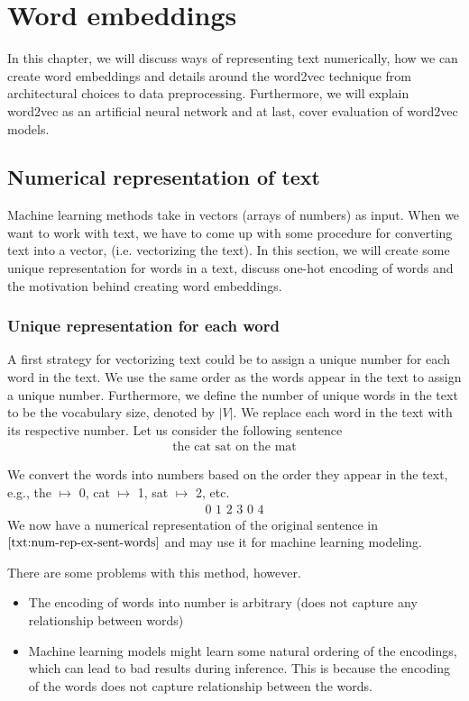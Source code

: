 \chapter{Word embeddings}
In this chapter, we will discuss ways of representing text numerically, how we can create word embeddings and details around the word2vec technique from architectural choices to data preprocessing. Furthermore, we will explain word2vec as an artificial neural network and at last, cover evaluation of word2vec models.

\section{Numerical representation of text}
Machine learning methods take in vectors (arrays of numbers) as input. When we want to work with text, we have to come up with some procedure for converting text into a vector, (i.e. vectorizing the text).
In this section, we will create some unique representation for words in a text, discuss one-hot encoding of words and the motivation behind creating word embeddings.

\subsection{Unique representation for each word}
\label{unique-representation-for-each-word}
A first strategy for vectorizing text could be to assign a unique number for each word in the text. We use the same order as the words appear in the text to assign a unique number. Furthermore, we define the number of unique words in the text to be the vocabulary size, denoted by $|V|$. We replace each word in the text with its respective number. Let us consider the following sentence
\begin{align}
    \text{the cat sat on the mat} \label{txt:num-rep-ex-sent-words}
\end{align}

We convert the words into numbers based on the order they appear in the text, e.g., the $\mapsto$ 0, cat $\mapsto$ 1, sat $\mapsto$ 2, etc.
\begin{align}
    \text{0 1 2 3 0 4} \label{txt:num-rep-ex-sent}
\end{align}
We now have a numerical representation of the original sentence in $\cref{txt:num-rep-ex-sent-words}$ and may use it for machine learning modeling.

There are some problems with this method, however.
\begin{itemize}
    \item The encoding of words into number is arbitrary (does not capture any relationship between words)
    \item Machine learning models might learn some natural ordering of the encodings, which can lead to bad results during inference. This is because the encoding of the words does not capture relationship between the words.
\end{itemize}


